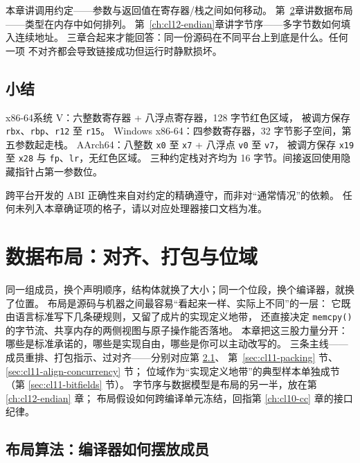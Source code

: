 \documentclass[12pt,a4paper,fontset=fandol]{ctexbook}
\newcommand{\Fn}[1]{\texttt{#1()}}
\newcommand{\Tp}[1]{\texttt{#1}}
\newcommand{\Win}{\textsf{Windows}}
\newcommand{\xSixtyFour}{\textsf{x86-64}}
\newcommand{\ArmSixtyFour}{\textsf{AArch64}}
\begin{document}
\begin{note}[title={三章关系}]
本章讲调用约定——参数与返回值在寄存器/栈之间如何移动。
第~\ref{ch:cl11-layout}章讲数据布局——类型在内存中如何排列。
第~\ref{ch:cl12-endian}章讲字节序——多字节数如何填入连续地址。
三章合起来才能回答：同一份源码在不同平台上到底是什么。任何一项
不对齐都会导致链接成功但运行时静默损坏。
\end{note}

\section{小结}\label{sec:cl10-summary}

\begin{abibox}[title={速查}]
\xSixtyFour 系统 V：六整数寄存器 + 八浮点寄存器，128 字节红色区域，
被调方保存 \Tp{rbx}、\Tp{rbp}、\Tp{r12} 至 \Tp{r15}。
\Win{} \xSixtyFour：四参数寄存器，32 字节影子空间，第五参数起走栈。
\ArmSixtyFour：八整数 \Tp{x0} 至 \Tp{x7} + 八浮点 \Tp{v0} 至 \Tp{v7}，
被调方保存 \Tp{x19} 至 \Tp{x28} 与 \Tp{fp}、\Tp{lr}，无红色区域。
三种约定栈对齐均为 16 字节。间接返回使用隐藏指针占第一参数位。
\end{abibox}

跨平台开发的 ABI 正确性来自对约定的精确遵守，而非对``通常情况''的依赖。
任何未列入本章确证项的格子，请以对应处理器接口文档为准。

\chapter{数据布局：对齐、打包与位域}\label{ch:cl11-layout}

同一组成员，换个声明顺序，结构体就换了大小；同一个位段，换个编译器，就换了位置。
布局是源码与机器之间最容易“看起来一样、实际上不同”的一层：
它既由语言标准写下几条硬规则，又留了成片的实现定义地带，
还直接决定 \Fn{memcpy} 的字节流、共享内存的两侧视图与原子操作能否落地。
本章把这三股力量分开：哪些是标准承诺的，哪些是实现自由，哪些是你可以主动改写的。
三条主线——成员重排、打包指示、过对齐——分别对应第 \ref{sec:cl11-layout-algo}、
第~\ref{sec:cl11-packing} 节、\ref{sec:cl11-align-concurrency} 节；
位域作为“实现定义地带”的典型样本单独成节（第 \ref{sec:cl11-bitfields} 节）。
字节序与数据模型是布局的另一半，放在第 \ref{ch:cl12-endian} 章；
布局假设如何跨编译单元冻结，回指第 \ref{ch:cl10-cc} 章的接口纪律。

\section{布局算法：编译器如何摆放成员}\label{sec:cl11-layout-algo}
\end{document}
